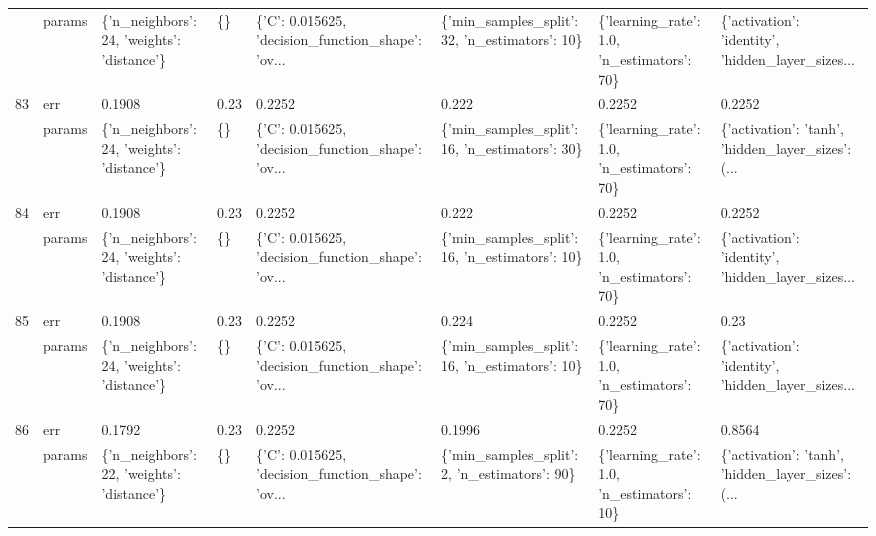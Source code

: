 \begin{tabular}{llllllll}
    & params &  \{'n\_neighbors': 24, 'weights': 'distance'\} &      \{\} &  \{'C': 0.015625, 'decision\_function\_shape': 'ov... &  \{'min\_samples\_split': 32, 'n\_estimators': 10\} &   \{'learning\_rate': 1.0, 'n\_estimators': 70\} &  \{'activation': 'identity', 'hidden\_layer\_sizes... \\
83  & err &                                      0.1908 &    0.23 &                                             0.2252 &                                          0.222 &                                       0.2252 &                                             0.2252 \\
    & params &  \{'n\_neighbors': 24, 'weights': 'distance'\} &      \{\} &  \{'C': 0.015625, 'decision\_function\_shape': 'ov... &  \{'min\_samples\_split': 16, 'n\_estimators': 30\} &   \{'learning\_rate': 1.0, 'n\_estimators': 70\} &  \{'activation': 'tanh', 'hidden\_layer\_sizes': (... \\
84  & err &                                      0.1908 &    0.23 &                                             0.2252 &                                          0.222 &                                       0.2252 &                                             0.2252 \\
    & params &  \{'n\_neighbors': 24, 'weights': 'distance'\} &      \{\} &  \{'C': 0.015625, 'decision\_function\_shape': 'ov... &  \{'min\_samples\_split': 16, 'n\_estimators': 10\} &   \{'learning\_rate': 1.0, 'n\_estimators': 70\} &  \{'activation': 'identity', 'hidden\_layer\_sizes... \\
85  & err &                                      0.1908 &    0.23 &                                             0.2252 &                                          0.224 &                                       0.2252 &                                               0.23 \\
    & params &  \{'n\_neighbors': 24, 'weights': 'distance'\} &      \{\} &  \{'C': 0.015625, 'decision\_function\_shape': 'ov... &  \{'min\_samples\_split': 16, 'n\_estimators': 10\} &   \{'learning\_rate': 1.0, 'n\_estimators': 70\} &  \{'activation': 'identity', 'hidden\_layer\_sizes... \\
86  & err &                                      0.1792 &    0.23 &                                             0.2252 &                                         0.1996 &                                       0.2252 &                                             0.8564 \\
    & params &  \{'n\_neighbors': 22, 'weights': 'distance'\} &      \{\} &  \{'C': 0.015625, 'decision\_function\_shape': 'ov... &   \{'min\_samples\_split': 2, 'n\_estimators': 90\} &   \{'learning\_rate': 1.0, 'n\_estimators': 10\} &  \{'activation': 'tanh', 'hidden\_layer\_sizes': (... \\

\end{tabular}
